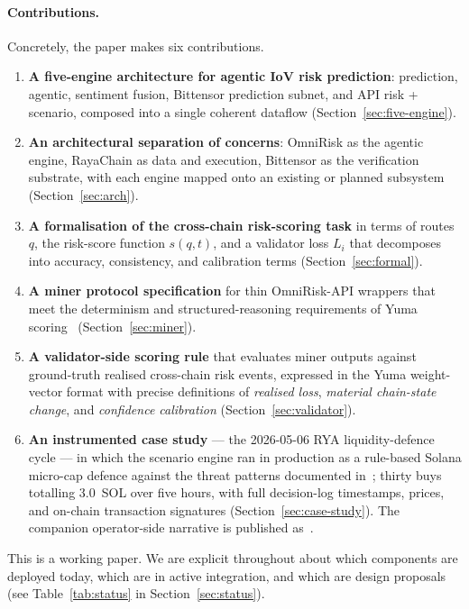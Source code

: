 \documentclass[11pt,a4paper]{article}
\begin{document}
\paragraph{Contributions.} Concretely, the paper makes six contributions.
\begin{enumerate}
  \item \textbf{A five-engine architecture for agentic IoV risk prediction}: prediction,
        agentic, sentiment fusion, Bittensor prediction subnet, and API risk + scenario,
        composed into a single coherent dataflow (Section~\ref{sec:five-engine}).
  \item \textbf{An architectural separation of concerns}: OmniRisk as the agentic engine,
        RayaChain as data and execution, Bittensor as the verification substrate, with
        each engine mapped onto an existing or planned subsystem
        (Section~\ref{sec:arch}).
  \item \textbf{A formalisation of the cross-chain risk-scoring task} in terms of
        routes $q$, the risk-score function $s(q,t)$, and a validator loss $L_i$ that
        decomposes into accuracy, consistency, and calibration terms
        (Section~\ref{sec:formal}).
  \item \textbf{A miner protocol specification} for thin OmniRisk-API wrappers that meet
        the determinism and structured-reasoning requirements of Yuma
        scoring~\cite{opentensor2024yuma} (Section~\ref{sec:miner}).
  \item \textbf{A validator-side scoring rule} that evaluates miner outputs against
        ground-truth realised cross-chain risk events, expressed in the Yuma weight-vector
        format with precise definitions of \emph{realised loss}, \emph{material chain-state
        change}, and \emph{confidence calibration} (Section~\ref{sec:validator}).
  \item \textbf{An instrumented case study} --- the 2026-05-06 RYA liquidity-defence
        cycle --- in which the scenario engine ran in production as a rule-based
        Solana micro-cap defence against the threat patterns documented
        in~\cite{cernera2023token}; thirty buys totalling 3.0~SOL over five hours,
        with full decision-log timestamps, prices, and on-chain transaction signatures
        (Section~\ref{sec:case-study}). The companion operator-side narrative is
        published as~\cite{omnirisk2026defending}.
\end{enumerate}

This is a working paper. We are explicit throughout about which components are deployed
today, which are in active integration, and which are design proposals (see
Table~\ref{tab:status} in Section~\ref{sec:status}).
\end{document}
